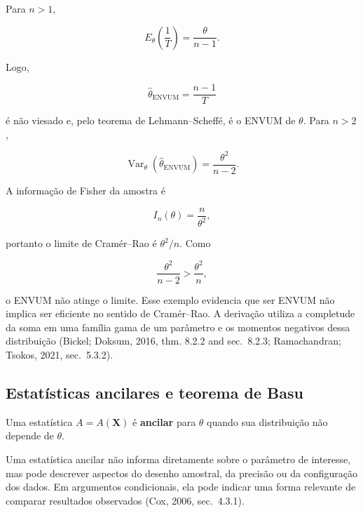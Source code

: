\documentclass[
  letterpaper,
  DIV=11,
  numbers=noendperiod]{scrreprt}
\begin{document}
Para \(n>1\),

\[E_\theta\left(\frac{1}{T}\right)
=
\frac{\theta}{n-1}.\]

Logo,

\[\widehat{\theta}_{\text{ENVUM}}
=
\frac{n-1}{T}\]

é não viesado e, pelo teorema de Lehmann--Scheffé, é o ENVUM de
\(\theta\). Para \(n>2\),

\[\operatorname{Var}_\theta\left(
\widehat{\theta}_{\text{ENVUM}}
\right)
=
\frac{\theta^2}{n-2}.\]

A informação de Fisher da amostra é

\[I_n(\theta)
=
\frac{n}{\theta^2},\]

portanto o limite de Cramér--Rao é \(\theta^2/n\). Como

\[\frac{\theta^2}{n-2}
>
\frac{\theta^2}{n},\]

o ENVUM não atinge o limite. Esse exemplo evidencia que ser ENVUM não
implica ser eficiente no sentido de Cramér--Rao. A derivação utiliza a
completude da soma em uma família gama de um parâmetro e os momentos
negativos dessa distribuição (Bickel; Doksum, 2016, thm. 8.2.2 and
sec.~8.2.3; Ramachandran; Tsokos, 2021, sec.~5.3.2).

\subsection*{Estatísticas ancilares e teorema de
Basu}\label{estatuxedsticas-ancilares-e-teorema-de-basu}

\begin{tcolorbox}[enhanced jigsaw, colback=white, leftrule=.75mm, colbacktitle=quarto-callout-important-color!10!white, breakable, titlerule=0mm, bottomtitle=1mm, title=\textcolor{quarto-callout-important-color}{\faExclamation}\hspace{0.5em}{Definição --- Ancilaridade}, colframe=quarto-callout-important-color-frame, toprule=.15mm, opacityback=0, bottomrule=.15mm, opacitybacktitle=0.6, arc=.35mm, toptitle=1mm, rightrule=.15mm, coltitle=black, left=2mm]

Uma estatística \(A=A(\mathbf{X})\) é \textbf{ancilar} para \(\theta\)
quando sua distribuição não depende de \(\theta\).

\end{tcolorbox}

Uma estatística ancilar não informa diretamente sobre o parâmetro de
interesse, mas pode descrever aspectos do desenho amostral, da precisão
ou da configuração dos dados. Em argumentos condicionais, ela pode
indicar uma forma relevante de comparar resultados observados (Cox,
2006, sec.~4.3.1).
\end{document}
